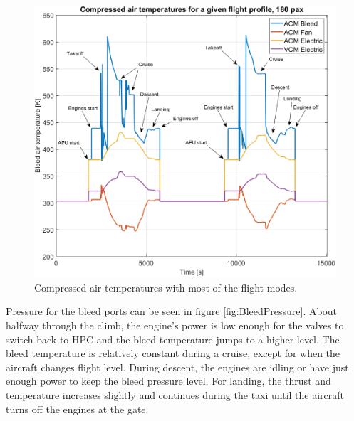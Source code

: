 \documentclass[english]{kththesis}
\begin{document}
\begin{figure}[!ht]
    \centering
    \includegraphics[width=1\textwidth]{Epictures/ECSCompTemp.png}
    \caption{Compressed air temperatures with most of the flight modes.}
    \label{fig:ECSCompTemp}
\end{figure}

\clearpage

Pressure for the bleed ports can be seen in figure \ref{fig:BleedPressure}. About halfway through the climb, the engine's power is low enough for the valves to switch back to HPC and the bleed temperature jumps to a higher level. The bleed temperature is relatively constant during a cruise, except for when the aircraft changes flight level. During descent, the engines are idling or have just enough power to keep the bleed pressure level. For landing, the thrust and temperature increases slightly and continues during the taxi until the aircraft turns off the engines at the gate.
\end{document}
